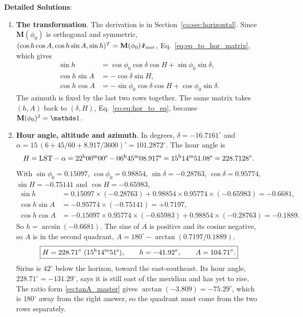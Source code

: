 \textbf{Detailed Solutions}:
\begin{enumerate}[label=(\alph*)]
	\item \textbf{The transformation}. The derivation is in Section~\ref{co:sec:horizontal}. Since $\mathbf M(\phi_0)$ is orthogonal and symmetric, $(\cos h\cos A,\cos h\sin A,\sin h)^T=\mathbf M(\phi_0)\,\hat{\mathbf r}_{\rm mer}$, Eq.~\eqref{eq:eq_to_hor_matrix}, which gives
	\begin{equation}
	\boxed{\begin{aligned}
		\sin h &= \cos\phi_0\cos\delta\cos H + \sin\phi_0\sin\delta,\\
		\cos h\sin A &= -\cos\delta\sin H,\\
		\cos h\cos A &= -\sin\phi_0\cos\delta\cos H + \cos\phi_0\sin\delta .
	\end{aligned}}
	\label{eq:ch2_prob_sinh}
	\end{equation}
	The azimuth is fixed by the last two rows together. The same matrix takes $(h,A)$ back to $(\delta,H)$, Eq.~\eqref{co:eq:hor_to_eq}, because $\mathbf M(\phi_0)^2=\Id$.

	\item \textbf{Hour angle, altitude and azimuth}. In degrees, $\delta=-16.7161^\circ$ and $\alpha=15\,(6+45/60+8.917/3600)^\circ=101.2872^\circ$. The hour angle is
	\[
	H=\mathrm{LST}-\alpha=22^{\rm h}00^{\rm m}00^{\rm s}-06^{\rm h}45^{\rm m}08.917^{\rm s}=15^{\rm h}14^{\rm m}51.08^{\rm s}=228.7128^\circ .
	\]
	With $\sin\phi_0=0.15097$, $\cos\phi_0=0.98854$, $\sin\delta=-0.28763$, $\cos\delta=0.95774$, $\sin H=-0.75141$ and $\cos H=-0.65983$,
	\begin{align}
		\sin h &= 0.15097\times(-0.28763)+0.98854\times0.95774\times(-0.65983)=-0.6681, \nonumber\\
		\cos h\sin A &= -0.95774\times(-0.75141)=+0.7197, \nonumber\\
		\cos h\cos A &= -0.15097\times0.95774\times(-0.65983)+0.98854\times(-0.28763)=-0.1889. \nonumber
	\end{align}
	So $h=\arcsin(-0.6681)$. The sine of $A$ is positive and its cosine negative, so $A$ is in the second quadrant, $A=180^\circ-\arctan(0.7197/0.1889)$.
	\[
	\boxed{H=228.71^\circ\ (15^{\rm h}14^{\rm m}51^{\rm s}),\qquad h=-41.92^\circ,\qquad A=104.71^\circ .}
	\]
	Sirius is $42^\circ$ below the horizon, toward the east-southeast. Its hour angle, $228.71^\circ=-131.29^\circ$, says it is still east of the meridian and has yet to rise. The ratio form \eqref{eq:tanA_master} gives $\arctan(-3.809)=-75.29^\circ$, which is $180^\circ$ away from the right answer, so the quadrant must come from the two rows separately.


\end{enumerate}
